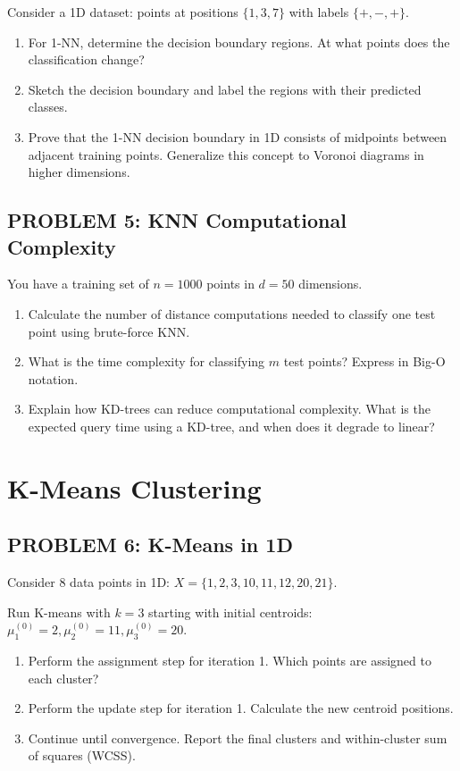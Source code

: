 \documentclass[12pt]{article}
\begin{document}
Consider a 1D dataset: points at positions \(\{1, 3, 7\}\) with labels \(\{+, -, +\}\).

\begin{enumerate}
\item[(a)] For 1-NN, determine the decision boundary regions. At what points does the classification change?
\item[(b)] Sketch the decision boundary and label the regions with their predicted classes.
\item[(c)] Prove that the 1-NN decision boundary in 1D consists of midpoints between adjacent training points. Generalize this concept to Voronoi diagrams in higher dimensions.
\end{enumerate}

\subsection*{PROBLEM 5: KNN Computational Complexity}

You have a training set of \(n = 1000\) points in \(d = 50\) dimensions.

\begin{enumerate}
\item[(a)] Calculate the number of distance computations needed to classify one test point using brute-force KNN.
\item[(b)] What is the time complexity for classifying \(m\) test points? Express in Big-O notation.
\item[(c)] Explain how KD-trees can reduce computational complexity. What is the expected query time using a KD-tree, and when does it degrade to linear?
\end{enumerate}


\newpage
\section*{K-Means Clustering}

\subsection*{PROBLEM 6: K-Means in 1D}

Consider 8 data points in 1D: \(X = \{1, 2, 3, 10, 11, 12, 20, 21\}\).

Run K-means with \(k = 3\) starting with initial centroids: \(\mu_1^{(0)} = 2, \mu_2^{(0)} = 11, \mu_3^{(0)} = 20\).

\begin{enumerate}
\item[(a)] Perform the assignment step for iteration 1. Which points are assigned to each cluster?
\item[(b)] Perform the update step for iteration 1. Calculate the new centroid positions.
\item[(c)] Continue until convergence. Report the final clusters and within-cluster sum of squares (WCSS).
\end{enumerate}
\end{document}
